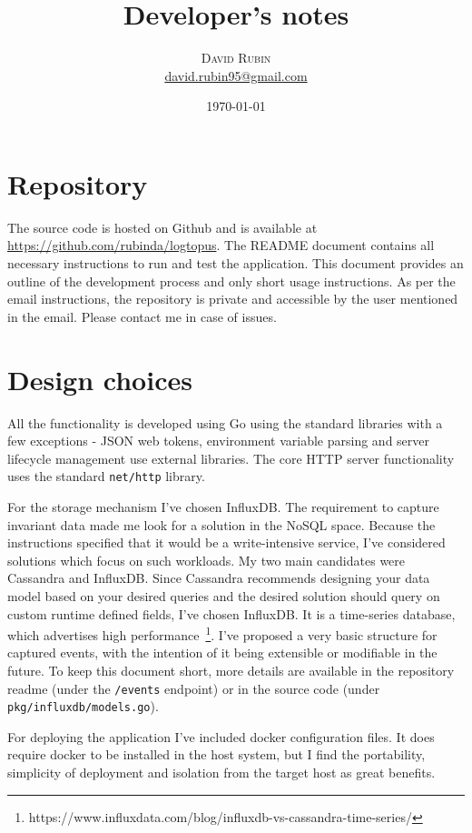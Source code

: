 \documentclass[twocolumn]{article}
\title{Developer's notes} %
\author{%
\textsc{David Rubin}\\[1ex] %
\normalsize \href{mailto:david.rubin95@gmail.com}{david.rubin95@gmail.com} %
}
\date{\today} %
\begin{document}
\maketitle

\section{Repository}
The source code is hosted on Github and is available at \url{https://github.com/rubinda/logtopus}. The README document contains all necessary instructions to run and test the application. This document provides an outline of the development process and only short usage instructions. As per the email instructions, the repository is private and accessible by the user mentioned in the email. Please contact me in case of issues. 

\section{Design choices}

All the functionality is developed using Go using the standard libraries with a few exceptions - JSON web tokens, environment variable parsing and server lifecycle management use external libraries. The core HTTP server functionality uses the standard \texttt{net/http} library.

For the storage mechanism I've chosen InfluxDB. The requirement to capture invariant data made me look for a solution in the NoSQL space. Because the instructions specified that it would be a write-intensive service, I've considered solutions which focus on such workloads. My two main candidates were Cassandra and InfluxDB. Since Cassandra recommends designing your data model based on your desired queries and the desired solution should query on custom runtime defined fields, I've chosen InfluxDB. It is a time-series database, which advertises high performance~\footnote{https://www.influxdata.com/blog/influxdb-vs-cassandra-time-series/}. I've proposed a very basic structure for captured events, with the intention of it being extensible or modifiable in the future. To keep this document short, more details are available in the repository readme (under the \texttt{/events} endpoint) or in the source code (under \texttt{pkg/influxdb/models.go}).

For deploying the application I've included docker configuration files. It does require docker to be installed in the host system, but I find the portability, simplicity of deployment and isolation from the target host as great benefits.
\end{document}
